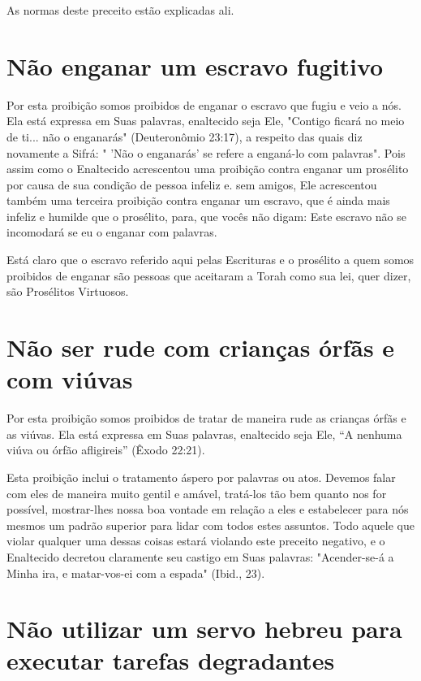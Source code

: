 As normas deste preceito estão explicadas ali.

\section{Não enganar um escravo fugitivo}

Por esta proibição somos proibidos de enganar o escravo que fugiu e veio
a nós. Ela está expressa em Suas palavras, enaltecido seja Ele, "Contigo
ficará no meio de ti... não o enganarás" (Deuteronômio 23:17), a
respeito das quais diz novamente a Sifrá: " 'Não o enganarás' se refere
a enganá-lo com pa­lavras". Pois assim como o Enaltecido acrescentou uma
proibição contra enga­nar um prosélito por causa de sua condição de
pessoa infeliz e. sem amigos, Ele acrescentou também uma terceira
proibição contra enganar um escravo, que é ainda mais infeliz e humilde
que o prosélito, para, que vocês não digam: Este escravo não se
incomodará se eu o enganar com palavras.

Está claro que o escravo referido aqui pelas Escrituras e o prosélito a
quem somos proibidos de enganar são pessoas que aceitaram a Torah como
sua lei, quer dizer, são Prosélitos Virtuosos.

\section{Não ser rude com crianças órfãs e com viúvas}

Por esta proibição somos proibidos de tratar de maneira rude as
crian­ças órfãs e as viúvas. Ela está expressa em Suas palavras,
enaltecido seja Ele, ``A nenhuma viúva ou órfão afligireis'' (Êxodo
22:21).

Esta proibição inclui o tratamento áspero por palavras ou atos. De­vemos
falar com eles de maneira muito gentil e amável, tratá-los tão bem
quan­to nos for possível, mostrar-lhes nossa boa vontade em relação a
eles e estabe­lecer para nós mesmos um padrão superior para lidar com
todos estes assun­tos. Todo aquele que violar qualquer uma dessas coisas
estará violando este preceito negativo, e o Enaltecido decretou
claramente seu castigo em Suas pa­lavras: "Acender-se-á a Minha ira, e
matar-vos-ei com a espada" (Ibid., 23).

\section{Não utilizar um servo hebreu para executar tarefas degradantes}

